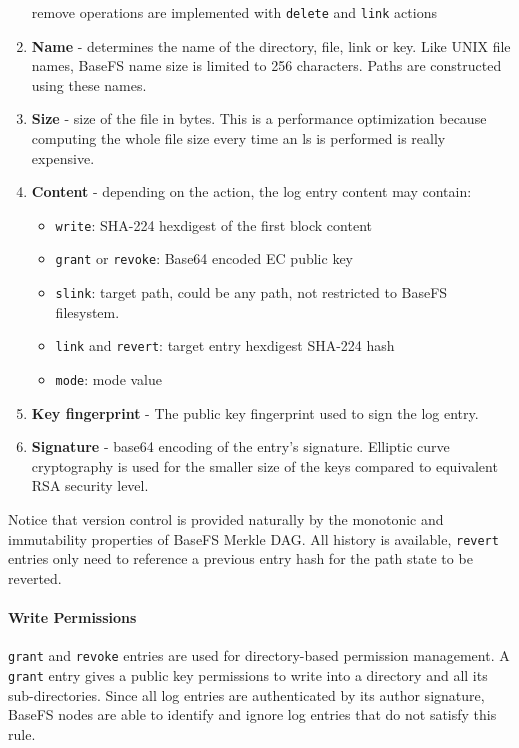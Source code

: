 \documentclass{sig-alternate}
\begin{document}
\begin{enumerate}
remove operations are implemented with \texttt{delete} and \texttt{link} actions
\item \textbf{Name} - determines the name of the directory, file, link or key. Like UNIX file names, BaseFS name size is limited to 256 characters. Paths are constructed using these names.
\item \textbf{Size} - size of the file in bytes. This is a performance optimization because computing the whole file size every time an ls is performed is really expensive.
\item \textbf{Content} - depending on the action, the log entry content may contain:
    \begin{itemize}
    \item \texttt{write}: SHA-224 hexdigest of the first block content
    \item \texttt{grant} or \texttt{revoke}: Base64 encoded EC public key
    \item \texttt{slink}: target path, could be any path, not restricted to BaseFS filesystem.
    \item \texttt{link} and \texttt{revert}: target entry hexdigest SHA-224 hash
    \item \texttt{mode}: mode value
    \end{itemize}
\item \textbf{Key fingerprint} - The public key fingerprint used to sign the log entry.
\item \textbf{Signature} - base64 encoding of the entry's signature. Elliptic curve cryptography is used for the smaller size of the keys compared to equivalent RSA security level.
\end{enumerate}

Notice that version control is provided naturally by the monotonic and immutability properties of BaseFS Merkle DAG. All history is available, \texttt{revert} entries only need to reference a previous entry hash for the path state to be reverted.

\paragraph{Write Permissions}

\texttt{grant} and \texttt{revoke} entries are used for directory-based permission management. A \texttt{grant} entry gives a public key permissions to write into a directory and all its sub-directories. Since all log entries are authenticated by its author signature, BaseFS nodes are able to identify and ignore log entries that do not satisfy this rule. 
\end{document}
